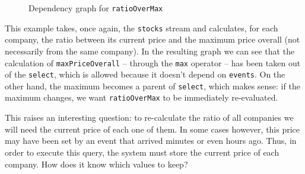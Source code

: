 \begin{figure}[t]
  \centering
  \caption{Dependency graph for \tt{ratioOverMax}}
\end{figure}


This example takes, once again, the \verb=stocks= stream and
calculates, for each company, the ratio between its current price and
the maximum price overall (not necessarily from the same company). In
the resulting graph we can see that the calculation of
\verb=maxPriceOverall= -- through the \verb=max= operator -- has been
taken out of the \verb=select=, which is allowed because it doesn't
depend on \verb=events=. On the other hand, the maximum becomes a
parent of \verb=select=, which makes sense: if the maximum changes, we
want \verb=ratioOverMax= to be immediately re-evaluated.

This raises an interesting question: to re-calculate the ratio of all
companies we will need the current price of each one of them. In some
cases however, this price may have been set by an event that arrived
minutes or even hours ago. Thus, in order to execute this query, the
system must store the current price of each company. How does it know
which values to keep?

